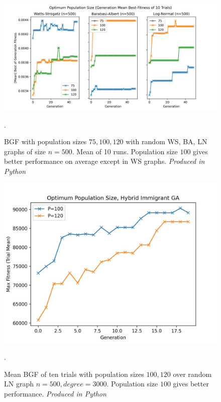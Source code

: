 \documentclass[
	a4paper, %
	10pt, %
	unnumberedsections, %
	twoside, %
]{LTJournalArticle}
\begin{document}
\begin{figure}
	\includegraphics[width=\linewidth]{Figures/sims/population/all_pop.jpg}
	\caption{BGF with population sizes \(75, 100, 120\) with random WS, BA, LN graphs of size \(n = 500\). Mean of 10 runs. Population size \(100\) gives better performance on average except in WS graphs. \emph{Produced in Python}}. 
	\label{fig:all_pop}
\end{figure}

\begin{figure}[H]
	\includegraphics[width=\linewidth]{Figures/sims/population/higa_pop.jpg}
	\caption{Mean BGF of ten trials with population sizes \(100, 120\) over random LN graph \(n = 500, degree = 3000\). Population size \(100\) gives better performance. \emph{Produced in Python}}. 
	\label{fig:higa_pop}
\end{figure}
\end{document}
